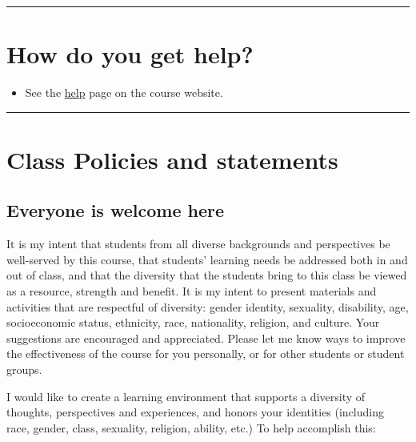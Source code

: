 \documentclass[
  letterpaper,
  DIV=11,
  numbers=noendperiod]{scrartcl}
\providecommand{\tightlist}{%
  \setlength{\itemsep}{0pt}\setlength{\parskip}{0pt}}\usepackage{longtable,booktabs,array}
\begin{document}
\begin{center}\rule{0.5\linewidth}{0.5pt}\end{center}

\hypertarget{how-do-you-get-help}{%
\section{How do you get help?}\label{how-do-you-get-help}}

\begin{itemize}
\tightlist
\item
  See the \href{help.html}{help} page on the course website.
\end{itemize}

\begin{center}\rule{0.5\linewidth}{0.5pt}\end{center}

\hypertarget{class-policies-and-statements}{%
\section{Class Policies and
statements}\label{class-policies-and-statements}}

\hypertarget{everyone-is-welcome-here}{%
\subsection{Everyone is welcome here}\label{everyone-is-welcome-here}}

It is my intent that students from all diverse backgrounds and
perspectives be well-served by this course, that students' learning
needs be addressed both in and out of class, and that the diversity that
the students bring to this class be viewed as a resource, strength and
benefit. It is my intent to present materials and activities that are
respectful of diversity: gender identity, sexuality, disability, age,
socioeconomic status, ethnicity, race, nationality, religion, and
culture. Your suggestions are encouraged and appreciated. Please let me
know ways to improve the effectiveness of the course for you personally,
or for other students or student groups.

I would like to create a learning environment that supports a diversity
of thoughts, perspectives and experiences, and honors your identities
(including race, gender, class, sexuality, religion, ability, etc.) To
help accomplish this:
\end{document}
